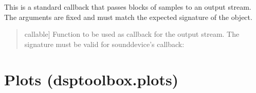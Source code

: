 \documentclass[letterpaper,10pt,english]{sphinxmanual}
\begin{document}
\begin{fulllineitems}
\label{\detokenize{modules/dsptoolbox.audio_io:dsptoolbox.audio_io.standard_callback}}
\pysigstartsignatures
{}
\pysigstopsignatures
\sphinxAtStartPar
This is a standard callback that passes blocks of samples to an output
stream. The arguments are fixed and must match the expected signature
of the  object.
\begin{quote}\begin{description}
\begin{description}
\sphinxlineitem{\sphinxstylestrong{call}}{[}callable{]}
\sphinxAtStartPar
Function to be used as callback for the output stream. The signature
must be valid for sounddevice’s callback:

\begin{sphinxVerbatim}[commandchars=\\\{\}]
       
\end{sphinxVerbatim}

\end{description}

\end{description}\end{quote}

\end{fulllineitems}


\sphinxstepscope


\section{Plots (dsptoolbox.plots)}
\label{\detokenize{modules/dsptoolbox.plots:module-dsptoolbox.plots}}\label{\detokenize{modules/dsptoolbox.plots:plots-dsptoolbox-plots}}\label{\detokenize{modules/dsptoolbox.plots::doc}}
\end{document}
